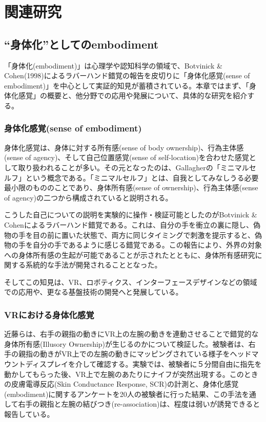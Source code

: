 \chapter{関連研究}
\label{related_works}

\section{``身体化''としてのembodiment}
「身体化(embodiment)」は心理学や認知科学の領域で、Botvinick \& Cohen(1998)によるラバーハンド錯覚の報告を皮切りに「身体化感覚(sense of embodiment)」を中心として実証的知見が蓄積されている。本章ではまず、「身体化感覚」の概要と、他分野での応用や発展について、具体的な研究を紹介する。

\subsection{身体化感覚(sense of embodiment)}

身体化感覚は、身体に対する所有感(sense of body ownership)、行為主体感(sense of agency)、そして自己位置感覚(sense of self-location)を合わせた感覚として取り扱われることが多い\cite{kilteni2012}。その元となったのは、Gallagherの「ミニマルセルフ」という概念である。「ミニマルセルフ」とは、自我としてみなしうる必要最小限のもののことであり、身体所有感(sense of ownership)、行為主体感(sense of agency)の二つから構成されていると説明される\cite{Gallagher2000}。

こうした自己についての説明を実験的に操作・検証可能としたのがBotvinick \& Cohenによるラバーハンド錯覚\cite{BotvinickCohen1998}である。これは、自分の手を衝立の裏に隠し、偽物の手を目の前に置いた状態で、両方に同じタイミングで刺激を提示すると、偽物の手を自分の手であるように感じる錯覚である。この報告により、外界の対象への身体所有感の生起が可能であることが示されたとともに、身体所有感研究に関する系統的な手法が開発されることとなった。

そしてこの知見は、VR、ロボティクス、インターフェースデザインなどの領域での応用や、更なる基盤技術の開発へと発展している。

\subsection{VRにおける身体化感覚}

近藤ら\cite{Kondo2020}は、右手の親指の動きにVR上の左腕の動きを連動させることで錯覚的な身体所有感(Illusory Ownership)が生じるのかについて検証した。被験者は、右手の親指の動きがVR上での左腕の動きにマッピングされている様子をヘッドマウントディスプレイを介して確認する。実験では、被験者に５分間自由に指先を動かしてもらった後、VR上で左腕のあたりにナイフが突然出現する。このときの皮膚電導反応(Skin Conductance Response, SCR)の計測と、身体化感覚(embodiment)に関するアンケートを20人の被験者に行った結果、この手法を通して右手の親指と左腕の結びつき(re-association)は、程度は弱いが誘発できると報告している。


